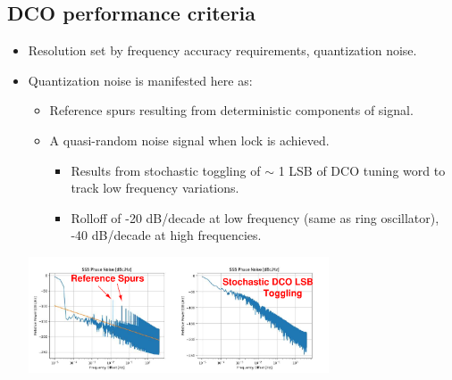 \documentclass[10pt,a4paper]{article}
\begin{document}
		\subsection{DCO performance criteria}
		\vspace{-.2em}
		\begin{itemize}
			\scriptsize
			\item Resolution set by frequency accuracy requirements, quantization noise.
			\item Quantization noise is manifested here as:
			\begin{itemize}
				\scriptsize			
				\item Reference spurs resulting from deterministic components of signal.
				\item A quasi-random noise signal when lock is achieved.
				\begin{itemize}
					\scriptsize			
					\item Results from stochastic toggling of $\sim$ 1 LSB of DCO tuning word to track low frequency variations.
					\item Rolloff of -20 dB/decade at low frequency (same as ring oscillator), -40 dB/decade at high frequencies.
				\end{itemize} 				
			\end{itemize} 
		\vspace{-1em}
		\center\includegraphics[width=0.7\textwidth, angle=0]{figs/quant_noise.pdf}
		\vspace{-0.5em}  
		\end{itemize}   

		\flushleft
\end{document}
